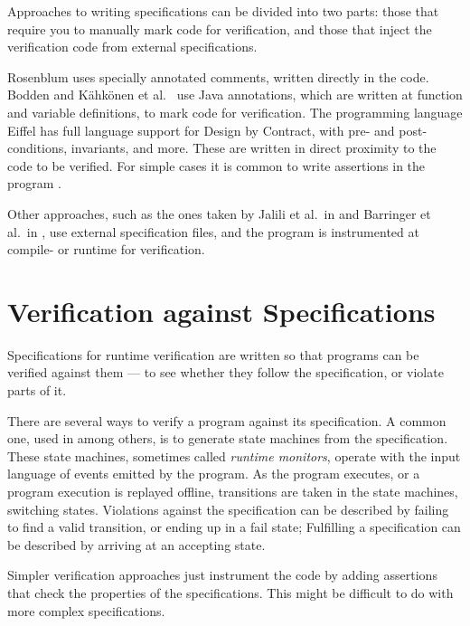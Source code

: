 \documentclass[a4paper,11pt]{kth-mag}
\begin{document}
Approaches to writing specifications can be divided into two parts: those that
require you to manually mark code for verification, and those that inject the
verification code from external specifications.

Rosenblum \cite{rosenblum95practicalassertions} uses specially annotated
comments, written directly in the code. Bodden
\cite{bodden05efficientrv,bodden04lightweightltl} and Kähkönen et al.\
\cite{kahkonen09lime} use Java annotations, which are written at function and
variable definitions, to mark code for verification. The programming language
Eiffel has full language support for Design by Contract, with pre- and
post-conditions, invariants, and more. These are written in direct proximity to
the code to be verified. For simple cases it is common to write assertions in
the program \cite{bartetzko01jass}.

Other approaches, such as the ones taken by Jalili et al.\ in
\cite{jalili07rverl} and Barringer et al.\ in \cite{barringer03eagle}, use
external specification files, and the program is instrumented at compile- or
runtime for verification.



\section{Verification against Specifications} \label{section-verification}

Specifications for runtime verification are written so that programs can be
verified against them --- to see whether they follow the specification, or
violate parts of it.

There are several ways to verify a program against its specification. A common
one, used in \cite{bauer06monitoring, bodden05efficientrv, jalili07rverl,
barringer03eagle} among others, is to generate state machines from the
specification. These state machines, sometimes called \textit{runtime
monitors}, operate with the input language of events emitted by the program. As
the program executes, or a program execution is replayed offline, transitions
are taken in the state machines, switching states. Violations against the
specification can be described by failing to find a valid transition, or ending
up in a fail state; Fulfilling a specification can be described by arriving at
an accepting state.

Simpler verification approaches just instrument the code by adding assertions
that check the properties of the specifications. This might be difficult to do
with more complex specifications.
\end{document}
